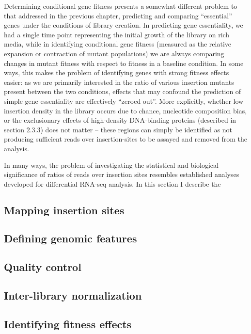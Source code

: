 Determining conditional gene fitness presents a somewhat different problem to that addressed in the previous chapter, predicting and comparing ``essential'' genes under the conditions of library creation. In predicting gene essentiality, we had a single time point representing the initial growth of the library on rich media, while in identifying conditional gene fitness (measured as the relative expansion or contraction of mutant populations) we are always comparing changes in mutant fitness with respect to fitness in a baseline condition. In some ways, this makes the problem of identifying genes with strong fitness effects easier: as we are primarily interested in the ratio of various insertion mutants present between the two conditions, effects that may confound the prediction of simple gene essentiality are effectively ``zeroed out''. More explicitly, whether low insertion density in the library occurs due to chance, nucleotide composition bias, or the exclusionary effects of high-density DNA-binding proteins (described in section 2.3.3) does not matter -- these regions can simply be identified as not producing sufficient reads over insertion-sites to be assayed and removed from the analysis.

In many ways, the problem of investigating the statistical and biological significance of ratios of reads over insertion sites resembles established analyses developed for differential RNA-seq analysis. In this section I describe the

\subsection{Mapping insertion sites}

\subsection{Defining genomic features}

\subsection{Quality control}

\subsection{Inter-library normalization}

\subsection{Identifying fitness effects}

